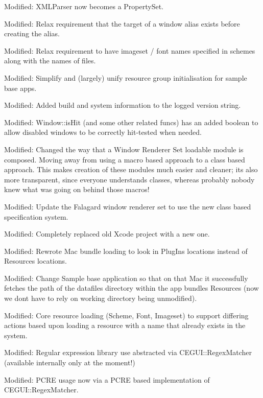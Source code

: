 \begin{DoxyItemize}
\item Modified\+: X\+M\+L\+Parser now becomes a Property\+Set.
\item Modified\+: Relax requirement that the target of a window alias exists before creating the alias.
\item Modified\+: Relax requirement to have imageset / font names specified in schemes along with the names of files.
\item Modified\+: Simplify and (largely) unify resource group initialisation for sample base apps.
\item Modified\+: Added build and system information to the logged version string.
\item Modified\+: Window\+::is\+Hit (and some other related funcs) has an added boolean to allow disabled windows to be correctly hit-\/tested when needed.
\item Modified\+: Changed the way that a \textquotesingle{}Window Renderer Set\textquotesingle{} loadable module is composed. Moving away from using a macro based approach to a class based approach. This makes creation of these modules much easier and cleaner; it\textquotesingle{}s also more transparent, since everyone understands classes, whereas probably nobody knew what was going on behind those macros!
\item Modified\+: Update the Falagard window renderer set to use the new class based specification system.
\item Modified\+: Completely replaced old Xcode project with a new one.
\item Modified\+: Rewrote Mac bundle loading to look in \textquotesingle{}Plug\+Ins\textquotesingle{} locations instead of \textquotesingle{}Resources\textquotesingle{} locations.
\item Modified\+: Change Sample base application so that on that Mac it successfully fetches the path of the datafiles directory within the app bundles Resources (now we don\textquotesingle{}t have to rely on working directory being unmodified).
\item Modified\+: Core resource loading (Scheme, Font, Imageset) to support differing actions based upon loading a resource with a name that already exists in the system.
\item Modified\+: Regular expression library use abstracted via C\+E\+G\+U\+I\+::\+Regex\+Matcher (available internally only at the moment!)
\item Modified\+: P\+C\+RE usage now via a P\+C\+RE based implementation of C\+E\+G\+U\+I\+::\+Regex\+Matcher.

\end{DoxyItemize}
